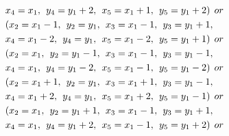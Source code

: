 \begin{appendices}
\begin{itemize}
\begin{align*}
\\&x_{4} = x_{1},\hspace{1ex}y_{4} = y_{1}+2,\hspace{1ex}x_{5} = x_{1}+1,\hspace{1ex}y_{5} = y_{1}+2)\hspace{1ex} or \\
&(x_{2} = x_{1}-1 ,\hspace{1ex}y_{2} = y_{1},\hspace{1ex}x_{3} = x_{1}-1,\hspace{1ex}y_{3} = y_{1}+1,
\\&x_{4} = x_{1}-2,\hspace{1ex}y_{4} = y_{1},\hspace{1ex}x_{5} = x_{1}-2,\hspace{1ex}y_{5} = y_{1}+1)\hspace{1ex} or \\
&(x_{2} = x_{1} ,\hspace{1ex}y_{2} = y_{1}-1,\hspace{1ex}x_{3} = x_{1}-1,\hspace{1ex}y_{3} = y_{1}-1,
\\&x_{4} = x_{1},\hspace{1ex}y_{4} = y_{1}-2,\hspace{1ex}x_{5} = x_{1}-1,\hspace{1ex}y_{5} = y_{1}-2)\hspace{1ex} or \\
&(x_{2} = x_{1}+1 ,\hspace{1ex}y_{2} = y_{1},\hspace{1ex}x_{3} = x_{1}+1,\hspace{1ex}y_{3} = y_{1}-1,
\\&x_{4} = x_{1}+2,\hspace{1ex}y_{4} = y_{1},\hspace{1ex}x_{5} = x_{1}+2,\hspace{1ex}y_{5} = y_{1}-1)\hspace{1ex} or \\
&(x_{2} = x_{1},\hspace{1ex}y_{2} = y_{1}+1,\hspace{1ex}x_{3} = x_{1}-1,\hspace{1ex}y_{3} = y_{1}+1,
\\&x_{4} = x_{1},\hspace{1ex}y_{4} = y_{1}+2,\hspace{1ex}x_{5} = x_{1}-1,\hspace{1ex}y_{5} = y_{1}+2)\hspace{1ex} or \\

\end{align*}
\end{itemize}
\end{appendices}
